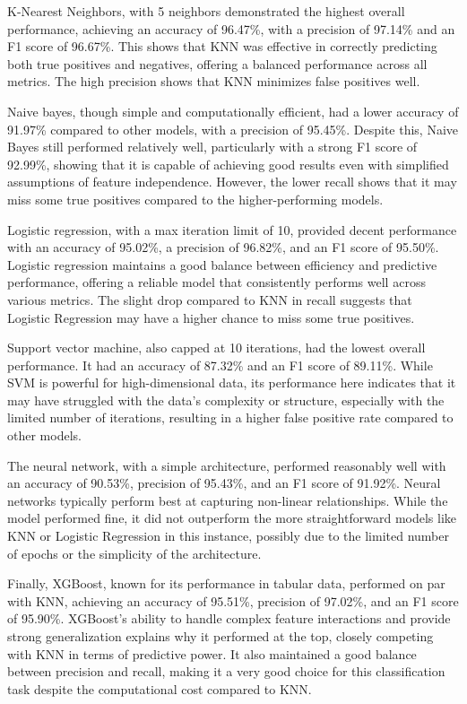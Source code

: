 \documentclass[manuscript,screen,review, nonacm]{acmart}
\begin{document}
K-Nearest Neighbors, with 5 neighbors demonstrated the highest overall performance, 
achieving an accuracy of 96.47\%, with a precision of 97.14\% and an F1 score of 
96.67\%. This shows that KNN was effective in correctly predicting both true positives 
and negatives, offering a balanced performance across all metrics. The high precision 
shows that KNN minimizes false positives well.

Naive bayes, though simple and computationally efficient, had a lower accuracy of 91.97\% 
compared to other models, with a precision of 95.45\%. Despite this, Naive Bayes still 
performed relatively well, particularly with a strong F1 score of 92.99\%, showing that it is 
capable of achieving good results even with simplified assumptions of feature independence. 
However, the lower recall shows that it may miss some true positives compared to the 
higher-performing models.

Logistic regression, with a max iteration limit of 10, provided decent performance with 
an accuracy of 95.02\%, a precision of 96.82\%, and an F1 score of 95.50\%. Logistic 
regression maintains a good balance between efficiency and predictive performance, 
offering a reliable model that consistently performs well across various metrics. The slight 
drop compared to KNN in recall suggests that Logistic Regression may have a higher chance 
to miss some true positives.

Support vector machine, also capped at 10 iterations, had the lowest overall performance. 
It had an accuracy of 87.32\% and an F1 score of 89.11\%. While SVM is powerful for 
high-dimensional data, its performance here indicates that it may have struggled with the 
data’s complexity or structure, especially with the limited number of iterations, resulting 
in a higher false positive rate compared to other models.

The neural network, with a simple architecture, performed reasonably well with an 
accuracy of 90.53\%, precision of 95.43\%, and an F1 score of 91.92\%. Neural networks 
typically perform best at capturing non-linear relationships. While the model performed 
fine, it did not outperform the more straightforward models like KNN or Logistic 
Regression in this instance, possibly due to the limited number of epochs or the simplicity 
of the architecture.

Finally, XGBoost, known for its performance in tabular data, performed on par 
with KNN, achieving an accuracy of 95.51\%, precision of 97.02\%, and an F1 score of 95.90\%. 
XGBoost’s ability to handle complex feature interactions and provide strong generalization 
explains why it performed at the top, closely competing with KNN in terms of predictive power. 
It also maintained a good balance between precision and recall, making it a very good choice 
for this classification task despite the computational cost compared to KNN.
\end{document}
